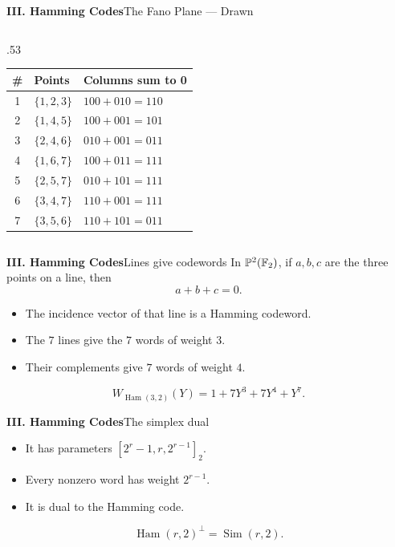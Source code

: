 \begin{frame}{\textbf{III. Hamming Codes}}{The Fano Plane — Drawn}
\begin{columns}[T,onlytextwidth]
\begin{column}{.53\textwidth}
    \begin{tabular}{c|l|l}
      \# & \textbf{Points} & \textbf{Columns sum to 0} \\\hline
      \rowcolor{TealDarkCyan!8}
      1 & $\{1,2,3\}$ & $100{+}010{=}110$ \\
      2 & $\{1,4,5\}$ & $100{+}001{=}101$ \\
      \rowcolor{TealDarkCyan!8}
      3 & $\{2,4,6\}$ & $010{+}001{=}011$ \\
      4 & $\{1,6,7\}$ & $100{+}011{=}111$ \\
      \rowcolor{TealDarkCyan!8}
      5 & $\{2,5,7\}$ & $010{+}101{=}111$ \\
      6 & $\{3,4,7\}$ & $110{+}001{=}111$ \\
      \rowcolor{TealDarkCyan!8}
      7 & $\{3,5,6\}$ & $110{+}101{=}011$ \\
    \end{tabular}

  \end{column}
\end{columns}
\end{frame}

\begin{frame}{\textbf{III. Hamming Codes}}{Lines give codewords}
\small
In $\mathbb{P}^2(\mathbb{F}_2)$, if $a,b,c$ are the three points on a line, then
\[
  a+b+c=0.
\]
\begin{itemize}
  \item The incidence vector of that line is a Hamming codeword.
  \item The $7$ lines give the $7$ words of weight $3$.
  \item Their complements give $7$ words of weight $4$.
\end{itemize}
\[
  W_{\operatorname{Ham}(3,2)}(Y)=1+7Y^3+7Y^4+Y^7.
\]
\end{frame}

\begin{frame}{\textbf{III. Hamming Codes}}{The simplex dual}
\small
{}
\begin{itemize}
  \item It has parameters $[2^r-1,r,2^{r-1}]_2$.
  \item Every nonzero word has weight $2^{r-1}$.
  \item It is dual to the Hamming code.
\end{itemize}
\[
  \operatorname{Ham}(r,2)^\perp=\operatorname{Sim}(r,2).
\]
\end{frame}

